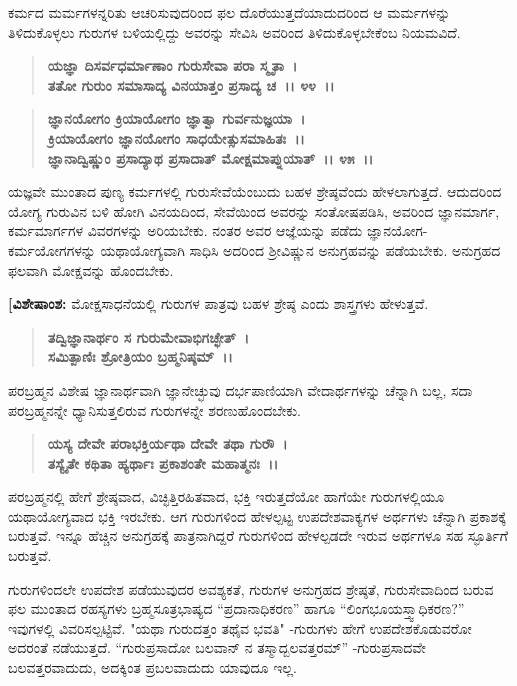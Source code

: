 ಕರ್ಮದ ಮರ್ಮಗಳನ್ನರಿತು ಆಚರಿಸುವುದರಿಂದ ಫಲ ದೊರೆಯುತ್ತದೆಯಾದುದರಿಂದ ಆ ಮರ್ಮಗಳನ್ನು ತಿಳಿದುಕೊಳ್ಳಲು ಗುರುಗಳ ಬಳಿಯಲ್ಲಿದ್ದು ಅವರನ್ನು ಸೇವಿಸಿ ಅವರಿಂದ ತಿಳಿದುಕೊಳ್ಳಬೇಕೆಂಬ ನಿಯಮವಿದೆ.

\begin{verse}
\textbf{ಯಜ್ಞಾ ದಿಸರ್ವಧರ್ಮಾಣಾಂ ಗುರುಸೇವಾ ಪರಾ ಸ್ಮೃತಾ~।}\\\textbf{ತತೋ ಗುರುಂ ಸಮಾಸಾದ್ಯ ವಿನಯಾತ್ತಂ ಪ್ರಸಾದ್ಯ ಚ~।। ೪೪~।। }
\end{verse}

\begin{verse}
\textbf{ಜ್ಞಾನಯೋಗಂ ಕ್ರಿಯಾಯೋಗಂ ಜ್ಞಾತ್ವಾ ಗುರ್ವನುಜ್ಞಯಾ~।}\\\textbf{ಕ್ರಿಯಾಯೋಗಂ ಜ್ಞಾನಯೋಗಂ ಸಾಧಯೇತ್ಸುಸಮಾಹಿತಃ~।।}\\\textbf{ಜ್ಞಾನಾದ್ವಿಷ್ಣುಂ ಪ್ರಸಾದ್ಯಾಥ ಪ್ರಸಾದಾತ್ ಮೋಕ್ಷಮಾಪ್ನುಯಾತ್~।। ೪೫~।।}
\end{verse}

ಯಜ್ಞವೇ ಮುಂತಾದ ಪುಣ್ಯ ಕರ್ಮಗಳಲ್ಲಿ ಗುರುಸೇವೆಯೆಂಬುದು ಬಹಳ ಶ್ರೇಷ್ಠವೆಂದು ಹೇಳಲಾಗುತ್ತದೆ. ಆದುದರಿಂದ ಯೋಗ್ಯ ಗುರುವಿನ ಬಳಿ ಹೋಗಿ ವಿನಯದಿಂದ, ಸೇವೆಯಿಂದ ಅವರನ್ನು ಸಂತೋಷಪಡಿಸಿ, ಅವರಿಂದ ಜ್ಞಾನಮಾರ್ಗ, ಕರ್ಮಮಾರ್ಗಗಳ ವಿವರಗಳನ್ನು ಅರಿಯಬೇಕು. ನಂತರ ಅವರ ಆಜ್ಞೆಯನ್ನು ಪಡೆದು ಜ್ಞಾನಯೋಗ-ಕರ್ಮಯೋಗಗಳನ್ನು ಯಥಾಯೋಗ್ಯವಾಗಿ ಸಾಧಿಸಿ ಅದರಿಂದ ಶ‍್ರೀವಿಷ್ಣುನ ಅನುಗ್ರಹವನ್ನು ಪಡೆಯಬೇಕು. ಅನುಗ್ರಹದ ಫಲವಾಗಿ ಮೋಕ್ಷವನ್ನು ಹೊಂದಬೇಕು.

\textbf{[ವಿಶೇಷಾಂಶ: }ಮೋಕ್ಷಸಾಧನೆಯಲ್ಲಿ ಗುರುಗಳ ಪಾತ್ರವು ಬಹಳ ಶ್ರೇಷ್ಠ ಎಂದು ಶಾಸ್ತ್ರಗಳು ಹೇಳುತ್ತವೆ.

\begin{verse}
\textbf{ತದ್ವಿಜ್ಞಾನಾರ್ಥಂ ಸ ಗುರುಮೇವಾಭಿಗಚ್ಛೇತ್~।}\\\textbf{ಸಮಿತ್ಪಾಣಿಃ ಶ್ರೋತ್ರಿಯಂ ಬ್ರಹ್ಮನಿಷ್ಠಮ್~।।} 
\end{verse}

ಪರಬ್ರಹ್ಮನ ವಿಶೇಷ ಜ್ಞಾನಾರ್ಥವಾಗಿ ಜ್ಞಾನೇಚ್ಛುವು ದರ್ಭಪಾಣಿಯಾಗಿ ವೇದಾರ್ಥಗಳನ್ನು ಚೆನ್ನಾಗಿ ಬಲ್ಲ, ಸದಾ ಪರಬ್ರಹ್ಮನನ್ನೇ ಧ್ಯಾನಿಸುತ್ತಲಿರುವ ಗುರುಗಳನ್ನೇ ಶರಣುಹೊಂದಬೇಕು.

\begin{verse}
\textbf{ಯಸ್ಯ ದೇವೇ ಪರಾಭಕ್ತಿರ್ಯಥಾ ದೇವೇ ತಥಾ ಗುರೌ~।}\\\textbf{ತಸ್ಯೈತೇ ಕಥಿತಾ ಹ್ಯರ್ಥಾಃ ಪ್ರಕಾಶಂತೇ ಮಹಾತ್ಮನಃ~।।} 
\end{verse}

ಪರಬ್ರಹ್ಮನಲ್ಲಿ ಹೇಗೆ ಶ್ರೇಷ್ಠವಾದ, ವಿಚ್ಛಿತ್ತಿರಹಿತವಾದ, ಭಕ್ತಿ ಇರುತ್ತದೆಯೋ ಹಾಗೆಯೇ ಗುರುಗಳಲ್ಲಿಯೂ ಯಥಾಯೋಗ್ಯವಾದ ಭಕ್ತಿ ಇರಬೇಕು. ಆಗ ಗುರುಗಳಿಂದ ಹೇಳಲ್ಪಟ್ಟ ಉಪದೇಶವಾಕ್ಯಗಳ ಅರ್ಥಗಳು ಚೆನ್ನಾಗಿ ಪ್ರಕಾಶಕ್ಕೆ ಬರುತ್ತವೆ. ಇನ್ನೂ ಹೆಚ್ಚಿನ ಅನುಗ್ರಹಕ್ಕೆ ಪಾತ್ರನಾಗಿದ್ದರೆ ಗುರುಗಳಿಂದ ಹೇಳಲ್ಪಡದೇ ಇರುವ ಅರ್ಥಗಳೂ ಸಹ ಸ್ಫೂರ್ತಿಗೆ ಬರುತ್ತವೆ.

ಗುರುಗಳಿಂದಲೇ ಉಪದೇಶ ಪಡೆಯುವುದರ ಅವಶ್ಯಕತೆ, ಗುರುಗಳ ಅನುಗ್ರಹದ ಶ್ರೇಷ್ಠತೆ, ಗುರುಸೇವಾದಿಂದ ಬರುವ ಫಲ ಮುಂತಾದ ರಹಸ್ಯಗಳು ಬ್ರಹ್ಮಸೂತ್ರಭಾಷ್ಯದ “ಪ್ರದಾನಾಧಿಕರಣ” ಹಾಗೂ “ಲಿಂಗಭೂಯಸ್ತ್ವಾಧಿಕರಣ?” ಇವುಗಳಲ್ಲಿ ವಿವರಿಸಲ್ಪಟ್ಟಿವೆ. "ಯಥಾ ಗುರುದತ್ತಂ ತಥೈವ ಭವತಿ" -ಗುರುಗಳು ಹೇಗೆ ಉಪದೇಶಕೊಡುವರೋ ಅದರಂತೆ ನಡೆಯುತ್ತದೆ. “ಗುರುಪ್ರಸಾದೋ ಬಲವಾನ್ ನ ತಸ್ಮಾದ್ಬಲವತ್ತರಮ್” -ಗುರುಪ್ರಸಾದವೇ ಬಲವತ್ತರವಾದುದು, ಅದಕ್ಕಿಂತ ಪ್ರಬಲವಾದುದು ಯಾವುದೂ ಇಲ್ಲ.

